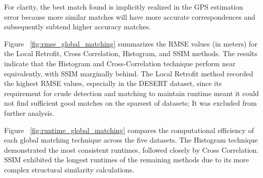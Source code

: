 For clarity, the best match found is implicitly realized in the GPS estimation error because more similar matches will have more accurate correspondences and subsequently subtend higher accuracy matches. 

Figure ~\ref{fig:rmse_global_matching} summarizes the RMSE values (in meters) for the Local Retrofit, Cross Correlation, Histogram, and SSIM methods. The results indicate that the Histogram and Cross-Correlation technique perform near equivalently, with SSIM marginally behind. The Local Retrofit method recorded the highest RMSE values, especially in the DESERT dataset, since its requirement for crude detection and matching to maintain runtime meant it could not find sufficient good matches on the sparsest of datasets; It was excluded from further analysis.

Figure ~\ref{fig:runtime_global_matching} compares the computational efficiency of each global matching technique across the five datasets. The Histogram technique demonstrated the most consistent runtimes, followed closely by Cross Correlation. SSIM exhibited the longest runtimes of the remaining methods due to its more complex structural similarity calculations. 


